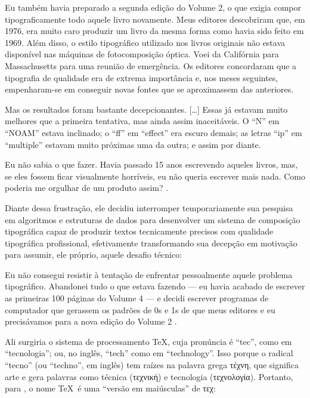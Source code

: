 \begin{citacao}
    Eu também havia preparado a segunda edição do Volume 2, o que exigia compor tipograficamente todo aquele livro novamente. Meus editores descobriram que, em 1976, era muito caro produzir um livro da mesma forma como havia sido feito em 1969. Além disso, o estilo tipográfico utilizado nos livros originais não estava disponível nas máquinas de fotocomposição óptica. Voei da Califórnia para Massachusetts para uma reunião de emergência. Os editores concordaram que a tipografia de qualidade era de extrema importância e, nos meses seguintes, empenharam-se em conseguir novas fontes que se aproximassem das anteriores.

    Mas os resultados foram bastante decepcionantes. [\ldots] Essas já estavam muito melhores que a primeira tentativa, mas ainda assim inaceitáveis. O ``N'' em ``NOAM'' estava inclinado; o ``ff'' em ``effect'' era escuro demais; as letras ``ip'' em ``multiple'' estavam muito próximas uma da outra; e assim por diante.

    Eu não sabia o que fazer. Havia passado 15 anos escrevendo aqueles livros, mas, se eles fossem ficar visualmente horríveis, eu não queria escrever mais nada. Como poderia me orgulhar de um produto assim?
    \cite[tradução própria]{Knuth1996Kyoto}.
\end{citacao}

Diante dessa frustração, ele decidiu interromper temporariamente sua pesquisa em algoritmos e estruturas de dados para desenvolver um sistema de composição tipográfica capaz de produzir textos tecnicamente precisos com qualidade tipográfica profissional, efetivamente transformando sua decepção em motivação para assumir, ele próprio, aquele desafio técnico:

\begin{citacao}
    Eu não consegui resistir à tentação de enfrentar pessoalmente aquele problema tipográfico. Abandonei tudo o que estava fazendo --- eu havia acabado de escrever as primeiras 100 páginas do Volume 4 --- e decidi escrever programas de computador que gerassem os padrões de 0s e 1s de que meus editores e eu precisávamos para a nova edição do Volume 2
    \cite[tradução própria]{Knuth1996Kyoto}.
\end{citacao}

Ali surgiria o sistema de processamento \TeX, cuja pronúncia é ``tec'', como em ``tecnologia''; ou, no inglês, ``tech'' como em ``technology''. Isso porque o radical ``tecno'' (ou ``techno'', em inglês) tem raízes na palavra grega \foreignlanguage{greek}{τέχνη}, que significa arte e gera palavras como técnica (\foreignlanguage{greek}{τεχνική}) e tecnologia (\foreignlanguage{greek}{τεχνολογία}). Portanto, para \textcite{Knuth1984}, o nome \TeX\ é uma ``versão em maiúsculas'' de \foreignlanguage{greek}{τεχ}:

